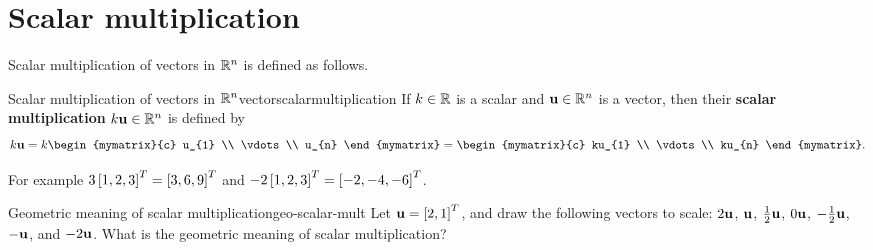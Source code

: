 \section{Scalar multiplication}

Scalar multiplication of vectors in $\mathbb{R}^n$ is defined as 
follows.

\begin{definition}{Scalar multiplication of vectors in $\mathbb{R}^n$}{vectorscalarmultiplication}
  If $k\in\mathbb{R}$ is a scalar and $\mbox{\bf u}\in \mathbb{R}^{n}$ is a vector, then
  their
  \textbf{scalar multiplication}
  $k\mbox{\bf u}\in \mathbb{R}^{n}$ is defined by
  \begin{equation*}
    k\vect{u}=k\begin{mymatrix}{c}
      u_{1} \\
      \vdots \\
      u_{n}
    \end{mymatrix} = \begin{mymatrix}{c}
      ku_{1} \\
      \vdots \\
      ku_{n}
    \end{mymatrix}.
  \end{equation*}
\end{definition}

For example $3 \left[ 1, 2, 3 \right]^T = \left[ 3, 6, 9 \right]^T$ and
$-2\left[ 1, 2, 3 \right]^T = \left[ -2, -4, -6 \right]^T$.

\begin{example}{Geometric meaning of scalar multiplication}{geo-scalar-mult}
  Let $\mbox{\bf u}=\left[2,1\right]^T$, and draw the following vectors to scale:
  $2\mbox{\bf u}$, $\mbox{\bf u}$, $\frac{1}{2}\mbox{\bf u}$, $0\mbox{\bf u}$,
  $-\frac{1}{2}\mbox{\bf u}$, $-\mbox{\bf u}$, and $-2\mbox{\bf u}$.  What is the
  geometric meaning of scalar multiplication?
\end{example}

